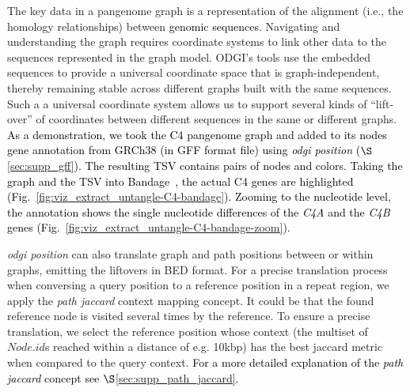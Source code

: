 \documentclass{bioinfo}
\newcommand{\REVIEWED}[1]{{\textcolor{Black}{#1}}}
\begin{document}
The key data in a pangenome graph is a representation of the alignment (i.e., the homology relationships) between \REVIEWED{genomic sequences}.
Navigating and understanding the graph requires coordinate systems to link other data to the sequences represented in the graph model.
ODGI's tools use the embedded sequences to provide a universal coordinate space that is graph-independent, thereby remaining stable across different graphs built with the same sequences.
Such a a universal coordinate system allows us to support several kinds of ``lift-over'' of coordinates between different sequences in the same or different graphs.
\REVIEWED{As a demonstration, we took the C4 pangenome graph and added to its nodes gene annotation from GRCh38 (in GFF format file) using \textit{odgi position} ($\S$\ref{sec:supp_gff}). The resulting TSV contains pairs of nodes and colors. Taking the graph and the TSV into Bandage~\citep{Wick_2015}, the actual C4 genes are highlighted (Fig.~\ref{fig:viz_extract_untangle-C4-bandage}). Zooming to the nucleotide level, the annotation shows the single nucleotide differences of the \textit{C4A} and the \textit{C4B} genes (Fig.~\ref{fig:viz_extract_untangle-C4-bandage-zoom}).}

\textit{odgi position} can also translate graph and path positions between or within graphs, emitting the liftovers in BED format.
For a precise translation process when conversing a query position to a reference position in a repeat region, we apply the \textit{path jaccard} context mapping concept.
It could be that the found reference node is visited several times by the reference.
To ensure a precise translation, we select the reference position whose context (the multiset of $Node.id$s reached within a distance of e.g. 10kbp) has the best jaccard metric when compared to the query context. \REVIEWED{For a more detailed explanation of the \textit{path jaccard} concept see $\S$\ref{sec:supp_path_jaccard}.}

\end{document}
